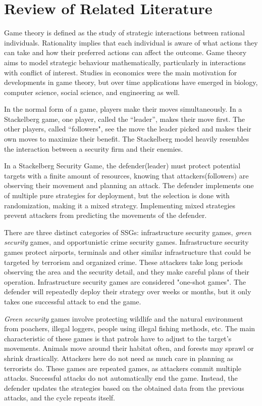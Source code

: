 \documentclass[journal]{./IEEE/IEEEtran}
\begin{document}
\section{Review of Related Literature}

Game theory is defined as the study of strategic interactions between rational individuals. Rationality implies that each individual is aware of what actions they can take and how their preferred actions can affect the outcome. Game theory aims to model strategic behaviour mathematically, particularly in interactions with conflict of interest.\cite{kockesen2007introduction} Studies in economics were the main motivation for developments in game theory, but over time applications have emerged in biology, computer science, social science, and engineering as well.

In the normal form of a game, players make their moves simultaneously. In a Stackelberg game, one player, called the ``leader'', makes their move first. The other players, called ``followers", see the move the leader picked and makes their own moves to maximize their benefit. The Stackelberg model heavily resembles the interaction between a security firm and their enemies.\cite{kar2017trends}

In a Stackelberg Security Game, the defender(leader) must protect potential targets with a finite amount of resources, knowing that attackers(followers) are observing their movement and planning an attack.\cite{kar2017trends} The defender implements one of multiple pure strategies for deployment, but the selection is done with randomization, making it a mixed strategy. Implementing mixed strategies prevent attackers from predicting the movements of the defender.\cite{an2017stackelberg}

There are three distinct categories of SSGs: infrastructure security games, \textit{green security} games, and opportunistic crime security games.\cite{an2017stackelberg} Infrastructure security games protect airports, terminals and other similar infrastructure that could be targeted by terrorism and organized crime.\cite{krausarmor} These attackers take long periods observing the area and the security detail, and they make careful plans of their operation. Infrastructure security games are considered "one-shot games". The defender will repeatedly deploy their strategy over weeks or months, but it only takes one successful attack to end the game.\cite{an2017stackelberg}

\textit{Green security} games involve protecting wildlife and the natural environment from poachers, illegal loggers, people using illegal fishing methods, etc.\cite{fang2017paws} The main characteristic of these games is that patrols have to adjust to the target's movements. Animals move around their habitat often, and forests may sprawl or shrink drastically. Attackers here do not need as much care in planning as terrorists do. These games are repeated games, as attackers commit multiple attacks. Successful attacks do not automatically end the game. Instead, the defender updates the strategies based on the obtained data from the previous attacks, and the cycle repeats itself.\cite{an2017stackelberg}
\end{document}
